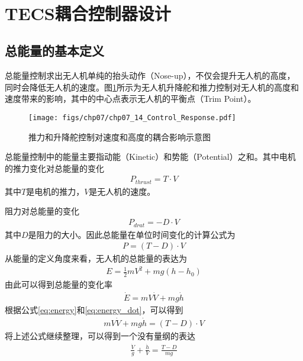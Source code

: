 ​\section{TECS耦合控制器设计}
\subsection{总能量的基本定义}
总能量控制求出无人机单纯的抬头动作（Nose-up），不仅会提升无人机的高度，同时会降低无人机的速度。图\ref{fig:chp07_14_Control_Response}所示为无人机升降舵和推力控制对无人机的高度和速度带来的影响，其中的中心点表示无人机的平衡点（Trim Point）。

\begin{figure}[ht]   
	\centering
	\texttt{[image: figs/chp07/chp07\_14\_Control\_Response.pdf]}
	\caption{推力和升降舵控制对速度和高度的耦合影响示意图}
	\label{fig:chp07_14_Control_Response}
\end{figure}

总能量控制中的能量主要指动能（Kinetic）和势能（Potential）之和。其中电机的推力变化对总能量的变化
\begin{align}
P_{thrust} = T \cdot V
\end{align}
其中$T$是电机的推力，$V$是无人机的速度。

阻力对总能量的变化
\begin{align}
P_{drat} = -D \cdot V
\end{align}
其中$D$是阻力的大小。因此总能量在单位时间变化的计算公式为
\begin{align}
P=(T-D)\cdot V
\end{align}
从能量的定义角度来看，无人机的总能量的表达为
\begin{align}
\label{eq:energy}
E = \frac{1}{2} mV^2 + mg(h - h_0)
\end{align}
由此可以得到总能量的变化率
\begin{align}
\label{eq:energy_dot}
\dot{E} = mV\dot{V} + mg\dot{h}
\end{align}
根据公式\ref{eq:energy}和\ref{eq:energy_dot}，可以得到
\begin{align}
mV\dot{V} + mg\dot{h} =(T-D)\cdot V
\end{align}
将上述公式继续整理，可以得到一个没有量纲的表达
\begin{align}
\label{eq:energy_3}
\frac{\dot{V}}{g} + \frac{\dot{h}}{V}  =\frac{T-D}{mg}
\end{align}

